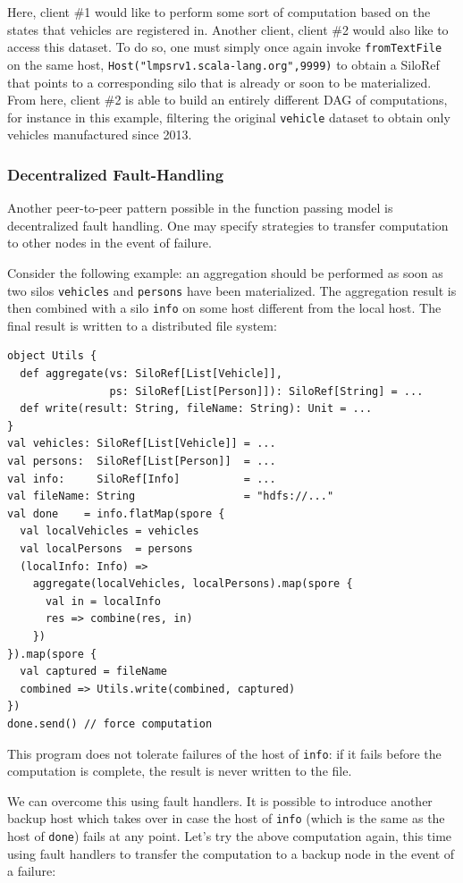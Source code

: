 \documentclass{jfp1}
\begin{document}
Here, client \#1 would like to perform some sort of computation based on the
states that vehicles are registered in. Another client, client \#2 would also
like to access this dataset. To do so, one must simply once again invoke
\verb|fromTextFile| on the same host, \verb|Host("lmpsrv1.scala-lang.org",9999)|
to obtain a SiloRef that points to a corresponding silo that is already or soon
to be materialized. From here, client \#2 is able to build an entirely different
DAG of computations, for instance in this example, filtering the original
\verb|vehicle| dataset to obtain only vehicles manufactured since 2013.

\subsubsection{Decentralized Fault-Handling}

Another peer-to-peer pattern possible in the function passing model is
decentralized fault handling. One may specify strategies to transfer computation
to other nodes in the event of failure.

Consider the following example: an aggregation should be performed as soon as
two silos \verb|vehicles| and \verb|persons| have been materialized. The
aggregation result is then combined with a silo \verb|info| on some host
different from the local host. The final result is written to a distributed file
system:

\vspace{-0.8mm}
\begin{lstlisting}
object Utils {
  def aggregate(vs: SiloRef[List[Vehicle]],
                ps: SiloRef[List[Person]]): SiloRef[String] = ...
  def write(result: String, fileName: String): Unit = ...
}
val vehicles: SiloRef[List[Vehicle]] = ...
val persons:  SiloRef[List[Person]]  = ...
val info:     SiloRef[Info]          = ...
val fileName: String                 = "hdfs://..."
val done    = info.flatMap(spore {
  val localVehicles = vehicles
  val localPersons  = persons
  (localInfo: Info) =>
    aggregate(localVehicles, localPersons).map(spore {
      val in = localInfo
      res => combine(res, in)
    })
}).map(spore {
  val captured = fileName
  combined => Utils.write(combined, captured)
})
done.send() // force computation
\end{lstlisting}
\noindent
This program does not tolerate failures of the host of \verb|info|: if it fails
before the computation is complete, the result is never written to the file.

We can overcome this using fault handlers. It is possible to introduce another
backup host which takes over in case the host of \verb|info| (which is the same
as the host of \verb|done|) fails at any point. Let's try the above computation
again, this time using fault handlers to transfer the computation to a backup
node in the event of a failure:
\end{document}
